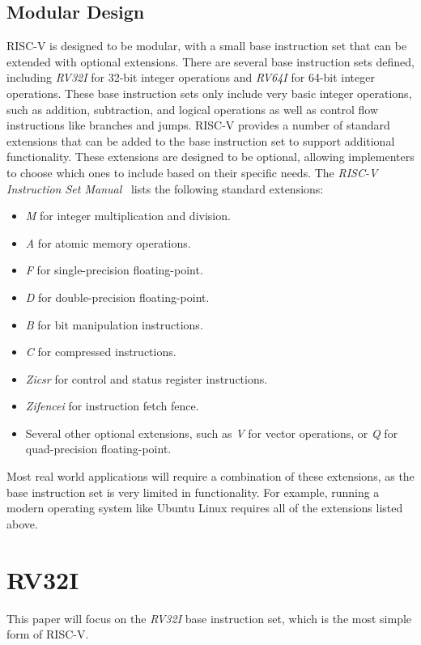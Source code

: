 \documentclass[sigconf]{acmart}
\begin{document}
\subsection{Modular Design}
RISC-V is designed to be modular, with a small base instruction set that can be extended with optional extensions.
There are several base instruction sets defined, including \textit{RV32I} for 32-bit integer operations and \textit{RV64I} for 64-bit integer operations.
These base instruction sets only include very basic integer operations, such as addition, subtraction, and logical operations as well as control flow instructions like branches and jumps.
RISC-V provides a number of standard extensions that can be added to the base instruction set to support additional functionality. These extensions are designed to be optional, allowing implementers to choose which ones to include based on their specific needs. The \textit{RISC-V Instruction Set Manual}~\cite{riscv-spec} lists the following standard extensions:
\begin{itemize}
    \item \textit{M} for integer multiplication and division.
    \item \textit{A} for atomic memory operations.
    \item \textit{F} for single-precision floating-point.
    \item \textit{D} for double-precision floating-point.
    \item \textit{B} for bit manipulation instructions.
    \item \textit{C} for compressed instructions.
    \item \textit{Zicsr} for control and status register instructions.
    \item \textit{Zifencei} for instruction fetch fence.
    \item Several other optional extensions, such as \textit{V} for vector operations, or \textit{Q} for quad-precision floating-point.
\end{itemize}
Most real world applications will require a combination of these extensions, as the base instruction set is very limited in functionality.
For example, running a modern operating system like Ubuntu Linux requires all of the extensions listed above.

\section{RV32I}
This paper will focus on the \textit{RV32I} base instruction set, which is the most simple form of RISC-V.
\end{document}
